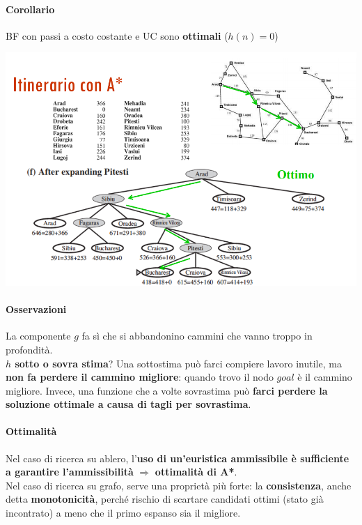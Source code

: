\documentclass[10pt]{book}
\begin{document}
\paragraph{Corollario} BF con passi a costo costante e UC sono \textbf{ottimali} ($h(n) = 0$)
\begin{center}
	\includegraphics[scale=0.5]{itAstar.png}
\end{center}
\pagebreak
\paragraph{Osservazioni} La componente $g$ fa sì che si abbandonino cammini che vanno troppo in profondità.\\
\textbf{$h$ sotto o sovra stima}? Una sottostima può farci compiere lavoro inutile, ma \textbf{non fa perdere il cammino migliore}: quando trovo il nodo $goal$ è il cammino migliore. Invece, una funzione che a volte sovrastima può \textbf{farci perdere la soluzione ottimale a causa di tagli per sovrastima}.
\paragraph{Ottimalità} Nel caso di ricerca su ablero, l'\textbf{uso di un'euristica ammissibile è sufficiente a garantire l'ammissibilità} $\Rightarrow$ \textbf{ottimalità di A*}.\\
Nel caso di ricerca su grafo, serve una proprietà più forte: la \textbf{consistenza}, anche detta \textbf{monotonicità}, perché rischio di scartare candidati ottimi (stato già incontrato) a meno che il primo espanso sia il migliore.
\end{document}
